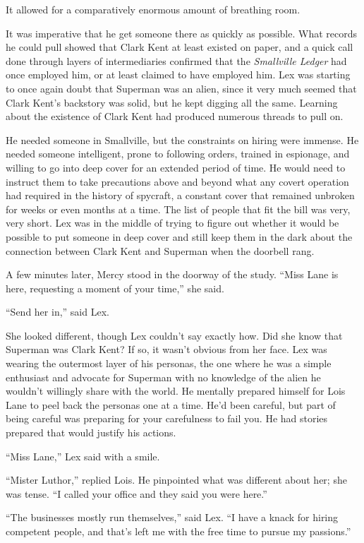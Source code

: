 \documentclass[ebook,12pt]{memoir}
\begin{document}
It allowed for a comparatively enormous amount of breathing room.

It was imperative that he get someone there as quickly as possible. What
records he could pull showed that Clark Kent at least existed on paper,
and a quick call done through layers of intermediaries confirmed that
the \emph{Smallville Ledger} had once employed him, or at least claimed
to have employed him. Lex was starting to once again doubt that Superman
was an alien, since it very much seemed that Clark Kent's backstory was
solid, but he kept digging all the same. Learning about the existence of
Clark Kent had produced numerous threads to pull on.

He needed someone in Smallville, but the constraints on hiring were
immense. He needed someone intelligent, prone to following orders,
trained in espionage, and willing to go into deep cover for an extended
period of time. He would need to instruct them to take precautions above
and beyond what any covert operation had required in the history of
spycraft, a constant cover that remained unbroken for weeks or even
months at a time. The list of people that fit the bill was very, very
short. Lex was in the middle of trying to figure out whether it would be
possible to put someone in deep cover and still keep them in the dark
about the connection between Clark Kent and Superman when the doorbell
rang.

A few minutes later, Mercy stood in the doorway of the study. ``Miss
Lane is here, requesting a moment of your time,'' she said.

``Send her in,'' said Lex.

She looked different, though Lex couldn't say exactly how. Did she know
that Superman was Clark Kent? If so, it wasn't obvious from her face.
Lex was wearing the outermost layer of his personas, the one where he
was a simple enthusiast and advocate for Superman with no knowledge of
the alien he wouldn't willingly share with the world. He mentally
prepared himself for Lois Lane to peel back the personas one at a time.
He'd been careful, but part of being careful was preparing for your
carefulness to fail you. He had stories prepared that would justify his
actions.

``Miss Lane,'' Lex said with a smile.

``Mister Luthor,'' replied Lois. He pinpointed what was different about
her; she was tense. ``I called your office and they said you were
here.''

``The businesses mostly run themselves,'' said Lex. ``I have a knack for
hiring competent people, and that's left me with the free time to pursue
my passions.''
\end{document}
